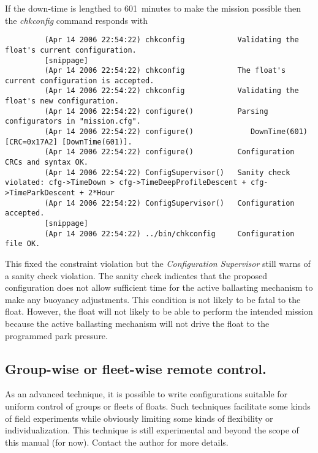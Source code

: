 If the down-time is lengthed to 601~minutes to make the mission possible
then the \emph{chkconfig} command responds with
{\tiny \begin{verbatim}
         (Apr 14 2006 22:54:22) chkconfig            Validating the float's current configuration.
         [snippage]
         (Apr 14 2006 22:54:22) chkconfig            The float's current configuration is accepted.
         (Apr 14 2006 22:54:22) chkconfig            Validating the float's new configuration.
         (Apr 14 2006 22:54:22) configure()          Parsing configurators in "mission.cfg".
         (Apr 14 2006 22:54:22) configure()             DownTime(601) [CRC=0x17A2] [DownTime(601)].
         (Apr 14 2006 22:54:22) configure()          Configuration CRCs and syntax OK.
         (Apr 14 2006 22:54:22) ConfigSupervisor()   Sanity check violated: cfg->TimeDown > cfg->TimeDeepProfileDescent + cfg->TimeParkDescent + 2*Hour
         (Apr 14 2006 22:54:22) ConfigSupervisor()   Configuration accepted.
         [snippage]
         (Apr 14 2006 22:54:22) ../bin/chkconfig     Configuration file OK.
\end{verbatim}}
   
This fixed the constraint violation but the \emph{Configuration Supervisor}
still warns of a sanity check violation.  The sanity check indicates that
the proposed configuration does not allow sufficient time for the active
ballasting mechanism to make any buoyancy adjustments.  This condition is
not likely to be fatal to the float.  However, the float will not likely to
be able to perform the intended mission because the active ballasting
mechanism will not drive the float to the programmed park pressure.
   
\subsection{Group-wise or fleet-wise remote control.}
\label{sec:FleetRemoteControl}

As an advanced technique, it is possible to write configurations suitable
for uniform control of groups or fleets of floats.  Such techniques
facilitate some kinds of field experiments while obviously limiting some
kinds of flexibility or individualization.  This technique is still
experimental and beyond the scope of this manual (for now).  Contact the
author for more details.

